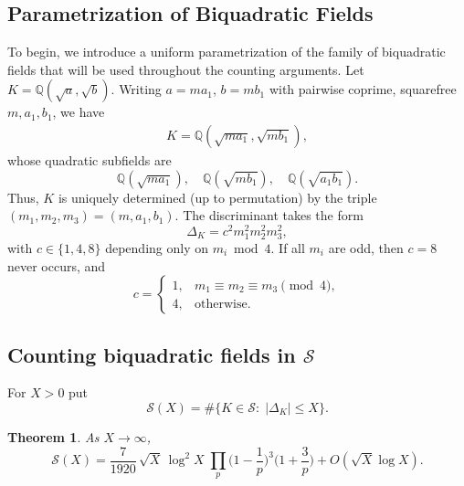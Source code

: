 \documentclass[12 pt]{amsart}
\newcommand{\cS}{\mathcal{S}}
\newtheorem{theorem}[thm]{Theorem}
\theoremstyle{definition}
\theoremstyle{remark}
\begin{document}
\subsection{Parametrization of Biquadratic Fields}
 To begin, we introduce a
uniform parametrization of the family of biquadratic fields that will be used
throughout the counting arguments.
Let $ K = \mathbb{Q}\left(\sqrt{a}, \sqrt{b}\right) $. 
Writing $ a = m a_1 $, $ b = m b_1 $ with pairwise coprime, squarefree 
$ m, a_1, b_1 $, we have
\begin{align*}
	K = \mathbb{Q}\left(\sqrt{m a_1}, \sqrt{m b_1}\right),
\end{align*}
whose quadratic subfields are
\[
\mathbb{Q}\left(\sqrt{m a_1}\right),\quad \mathbb{Q}\left(\sqrt{m b_1}\right),\quad
\mathbb{Q}\left(\sqrt{a_1 b_1}\right).
\]
Thus, $ K $ is uniquely determined (up to permutation) by the triple 
$\left(m_1, m_2, m_3\right) = \left(m, a_1, b_1\right)$. The discriminant takes the form
\[
\Delta_K = c^2 m_1^2 m_2^2 m_3^2,
\]
with $ c \in \{1,4,8\} $ depending only on $ m_i \bmod 4 $. 
If all $ m_i $ are odd, then $ c=8 $ never occurs, and
\[
c = 
\begin{cases}
	1, & m_1 \equiv m_2 \equiv m_3 \pmod{4},\\
	4, & \text{otherwise.}
\end{cases}
\]
\subsection{Counting biquadratic fields in $\cS$}

For $X>0$ put
\[
\cS(X)=\# \{K\in\cS:\;|\Delta_K|\le X\}.
\]

\begin{theorem}
	
	As $X\to\infty$,
	\[
	\cS(X)=\frac{7}{1920}\,\sqrt{X}\,\log^2 X\;\prod_{p}\Big(1-\frac{1}{p}\Big)^3\Big(1+\frac{3}{p}\Big)
	+O(\sqrt{X}\log X).
	\]
\end{theorem}
\end{document}
